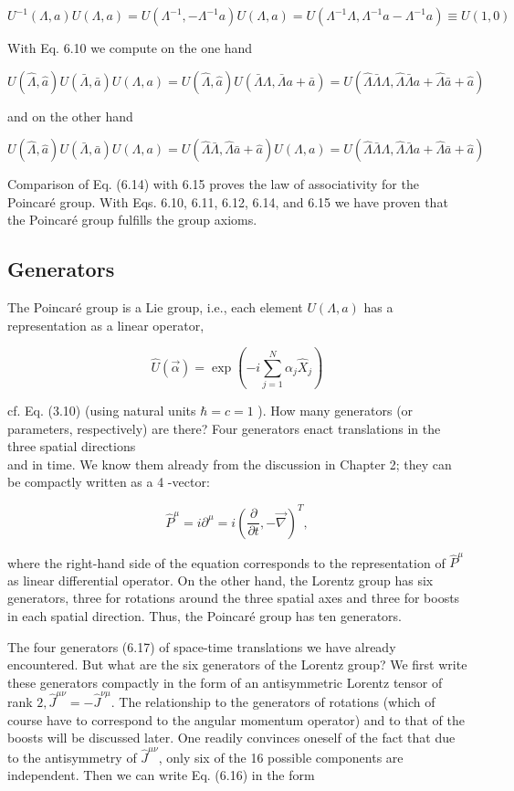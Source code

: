 \documentclass[10pt, letterpaper]{article}
\begin{document}
$$
U^{-1}(\Lambda, a) U(\Lambda, a)=U\left(\Lambda^{-1},-\Lambda^{-1} a\right) U(\Lambda, a)=U\left(\Lambda^{-1} \Lambda, \Lambda^{-1} a-\Lambda^{-1} a\right) \equiv U(1,0)
$$

With Eq. 6.10 we compute on the one hand

$$
U(\hat{\Lambda}, \hat{a}) U(\bar{\Lambda}, \bar{a}) U(\Lambda, a)=U(\hat{\Lambda}, \hat{a}) U(\bar{\Lambda} \Lambda, \bar{\Lambda} a+\bar{a})=U(\hat{\Lambda} \bar{\Lambda} \Lambda, \hat{\Lambda} \bar{\Lambda} a+\hat{\Lambda} \bar{a}+\hat{a})
$$

and on the other hand

$$
U(\hat{\Lambda}, \hat{a}) U(\bar{\Lambda}, \bar{a}) U(\Lambda, a)=U(\hat{\Lambda} \bar{\Lambda}, \hat{\Lambda} \bar{a}+\hat{a}) U(\Lambda, a)=U(\hat{\Lambda} \bar{\Lambda} \Lambda, \hat{\Lambda} \bar{\Lambda} a+\hat{\Lambda} \bar{a}+\hat{a})
$$

Comparison of Eq. (6.14) with 6.15 proves the law of associativity for the Poincaré group. With Eqs. 6.10, 6.11, 6.12, 6.14, and 6.15 we have proven that the Poincaré group fulfills the group axioms.

\subsection{Generators}
The Poincaré group is a Lie group, i.e., each element $U(\Lambda, a)$ has a representation as a linear operator,

$$
\hat{U}(\vec{\alpha})=\exp \left(-i \sum_{j=1}^{N} \alpha_{j} \hat{X}_{j}\right)
$$

cf. Eq. (3.10) (using natural units $\hbar=c=1$ ). How many generators (or parameters, respectively) are there? Four generators enact translations in the three spatial directions\\
and in time. We know them already from the discussion in Chapter 2; they can be compactly written as a 4 -vector:

$$
\hat{P}^{\mu}=i \partial^{\mu}=i\left(\frac{\partial}{\partial t},-\vec{\nabla}\right)^{T},
$$

where the right-hand side of the equation corresponds to the representation of $\hat{P}^{\mu}$ as linear differential operator. On the other hand, the Lorentz group has six generators, three for rotations around the three spatial axes and three for boosts in each spatial direction. Thus, the Poincaré group has ten generators.

The four generators (6.17) of space-time translations we have already encountered. But what are the six generators of the Lorentz group? We first write these generators compactly in the form of an antisymmetric Lorentz tensor of rank $2, \hat{J}^{\mu \nu}=-\hat{J}^{\nu \mu}$. The relationship to the generators of rotations (which of course have to correspond to the angular momentum operator) and to that of the boosts will be discussed later. One readily convinces oneself of the fact that due to the antisymmetry of $\hat{J}^{\mu \nu}$, only six of the 16 possible components are independent. Then we can write Eq. (6.16) in the form
\end{document}
